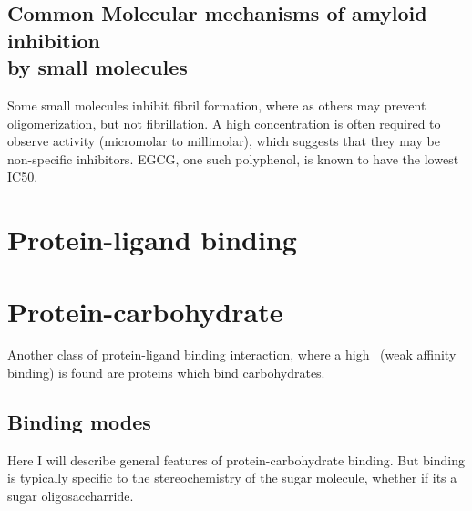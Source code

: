 \subsection{Common Molecular mechanisms of amyloid inhibition 
	            \\ by small molecules}
Some small molecules inhibit fibril formation, where as others may prevent oligomerization, but not fibrillation. A high concentration is often required to observe activity (micromolar to millimolar), which suggests that they may be non-specific inhibitors. EGCG, one such polyphenol, is known to have the lowest IC50.

\section{Protein-ligand binding}

\section{Protein-carbohydrate}
Another class of protein-ligand binding interaction, where a high \KD\ (weak affinity binding) is found are proteins which bind carbohydrates.


\subsection{Binding modes}
Here I will describe general features of protein-carbohydrate binding.
But binding is typically specific to the stereochemistry of the sugar molecule, whether if its a sugar oligosaccharride.

